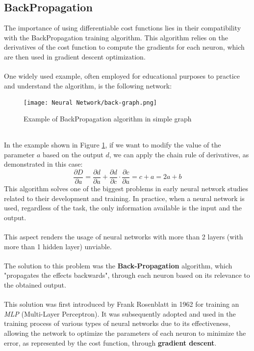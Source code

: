 \documentclass[a4paper, 11pt]{article}
\begin{document}
\subsection{BackPropagation}
The importance of using differentiable cost functions lies in their compatibility with the BackPropagation training algorithm. This algorithm relies on the derivatives of the cost function to compute the gradients for each neuron, which are then used in gradient descent optimization.\\\\
One widely used example, often employed for educational purposes to practice and understand the algorithm, is the following network:
\vspace{-1em}
\begin{figure}[h!]
    \centering
    \texttt{[image: Neural Network/back-graph.png]}
    \vspace{-3em}
    \caption{Example of BackPropagation algorithm in simple graph}
    \label{back-prop-example}
\end{figure}\\
In the example shown in Figure \ref{back-prop-example}, if we want to modify the value of the parameter $a$ based on the output $d$, we can apply the chain rule of derivatives, as demonstrated in this case:
\begin{equation*}
    \frac{\partial D}{\partial a} = \frac{\partial d}{\partial a} + \frac{\partial d}{\partial c} \cdot \frac{\partial c}{\partial a} = c + a = 2a+b
\end{equation*}
This algorithm solves one of the biggest problems in early neural network studies related to their development and training. In practice, when a neural network is used, regardless of the task, the only information available is the input and the output.\\\\
This aspect renders the usage of neural networks with more than 2 layers (with more than 1 hidden layer) unviable.\\\\
The solution to this problem was the \textbf{Back-Propagation} algorithm, which "propagates the effects backwards", through each neuron based on its relevance to the obtained output.\\\\
This solution was first introduced by Frank Rosenblatt in 1962 for training an \textit{MLP} (Multi-Layer Perceptron). It was subsequently adopted and used in the training process of various types of neural networks due to its effectiveness, allowing the network to optimize the parameters of each neuron to minimize the error, as represented by the cost function, through \textbf{gradient descent}.
\newpage
\end{document}
